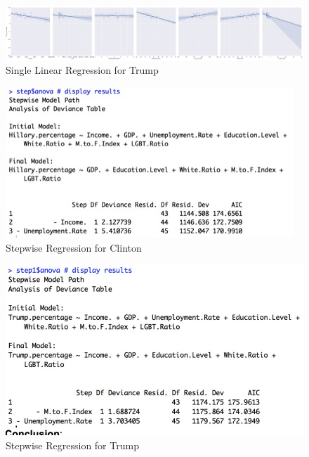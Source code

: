 \documentclass{article}
\begin{document}
{\begin{figure}[!h]
  \centering
    \includegraphics[scale=0.3]{TrumpSLR}
  \caption{Single Linear Regression for Trump}
\end{figure}

\begin{figure}[!htb]
  \centering
    \includegraphics[scale=0.7]{HillaryStepwiseRegression}
  \caption{Stepwise Regression for Clinton}
\end{figure}

\begin{figure}[!htb]
  \centering
    \includegraphics[scale=0.4]{TrumpStepwiseRegression}
  \caption{Stepwise Regression for Trump}
\end{figure}

}
\end{document}

